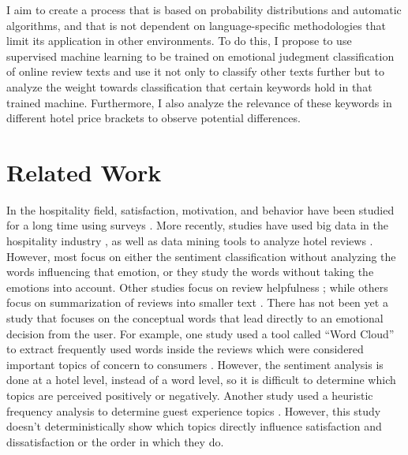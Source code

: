 \documentclass[review]{elsarticle}
\begin{document}
I aim to create a process that is based on probability distributions and automatic algorithms, and that is not dependent on language-specific methodologies that limit its application in other environments. To do this, I propose to use supervised machine learning to be trained on emotional judegment classification of online review texts and use it not only to classify other texts further but to analyze the weight towards classification that certain keywords hold in that trained machine. Furthermore, I also analyze the relevance of these keywords in different hotel price brackets to observe potential differences. 

\section{Related Work}\label{relatedwork}

In the hospitality field, satisfaction, motivation, and behavior have been studied for a long time using surveys \cite[e.g.][]{truong2009, wu2009, shanka2004, kozak2002, chang2008, romao2014, dongyang2015, chan201518}. More recently, studies have used big data in the hospitality industry \cite[e.g.][]{yang2014, loh2003}, as well as data mining tools to analyze hotel reviews \cite[e.g.][]{alsmadi2018, browning2013, xiang2010}. However, most focus on either the sentiment classification without analyzing the words influencing that emotion, or they study the words without taking the emotions into account. Other studies focus on review helpfulness \cite{ren2018}; while others focus on summarization of reviews into smaller text \cite[e.g.][]{hu2017436, amplayo201754}. There has not been yet a study that focuses on the conceptual words that lead directly to an emotional decision from the user. For example, one study used a tool called “Word Cloud” to extract frequently used words inside the reviews which were considered important topics of concern to consumers \cite{hargreaves2015}. However, the sentiment analysis is done at a hotel level, instead of a word level, so it is difficult to determine which topics are perceived positively or negatively. Another study used a heuristic frequency analysis to determine guest experience topics \cite{xiang2015}. However, this study doesn't deterministically show which topics directly influence satisfaction and dissatisfaction or the order in which they do.
\end{document}
